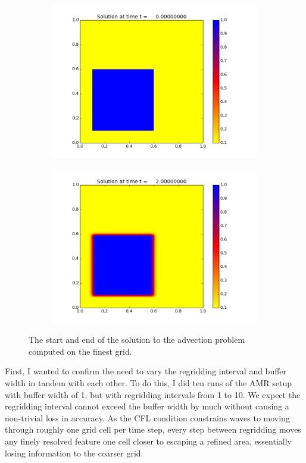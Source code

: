 \documentclass[11pt]{article}
\begin{document}
\begin{figure}[!htb]
\centering
	\begin{subfigure}[b]{0.45\textwidth}
		\includegraphics[width=\textwidth]{images/advec_base_t0}
	\end{subfigure}
	\begin{subfigure}[b]{0.45\textwidth}
		\includegraphics[width=\textwidth]{images/advec_base_t2}
	\end{subfigure}
	\caption{The start and end of the solution to the advection problem
			computed on the finest grid.}
	\label{fig:advec_base}
\end{figure}


First, I wanted to confirm the need to vary the regridding interval and
buffer width in tandem with each other. To do this, I did ten runs of the
AMR setup with buffer width of 1, but with regridding intervals from 1 to
10. We expect the regridding interval cannot exceed the buffer width by
much without causing a non-trivial loss in accuracy. As the CFL condition
constrains waves to moving through roughly one grid cell per time step,
every step between regridding moves any finely resolved feature one
cell closer to escaping a refined area, essentially losing information
to the coarser grid.
\end{document}
